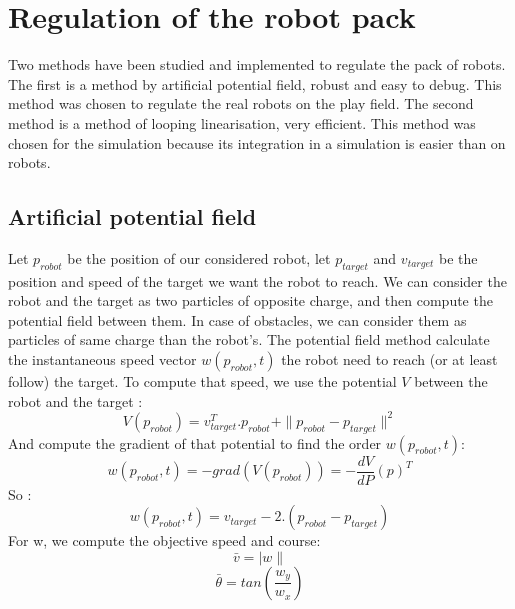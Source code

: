 
\section{Regulation of the robot pack}

Two methods have been studied and implemented to regulate the pack of robots. The first is a method by artificial potential field, robust and easy to debug. This method was chosen to regulate the real robots on the play field. The second method is a method of looping linearisation, very efficient. This method was chosen for the simulation because its integration in a simulation is easier than on robots.

\subsection{Artificial potential field}
Let $p_{robot}$ be the position of our considered robot, let $p_{target}$ and $v_{target}$ be the position and speed of the target we want the robot to reach.
We can consider the robot and the target as two particles of opposite charge, and then compute the potential field between them. In case of obstacles, we can consider them as particles of same charge than the robot's.
The potential field method calculate the instantaneous speed vector $w(p_{robot},t)$ the robot need to reach (or at least follow) the target. To compute that speed, we use the potential $V$ between the robot and the target :\\
\[ V(p_{robot}) = v^T_{target}. p_{robot} + \|p_{robot}-p_{target}\|^2 \]
And compute the gradient of that potential to find the order $w(p_{robot},t)$:
\[w(p_{robot},t) = -grad(V(p_{robot})) = -\frac{dV}{dP}(p)^T\]
So :
\[w(p_{robot},t) = v_{target}-2.(p_{robot}-p_{target})\]
For w, we compute the objective speed and course:
\[\bar{v} = |w\| \]
\[\bar{\theta} = tan(\frac{w_y}{w_x})\]
